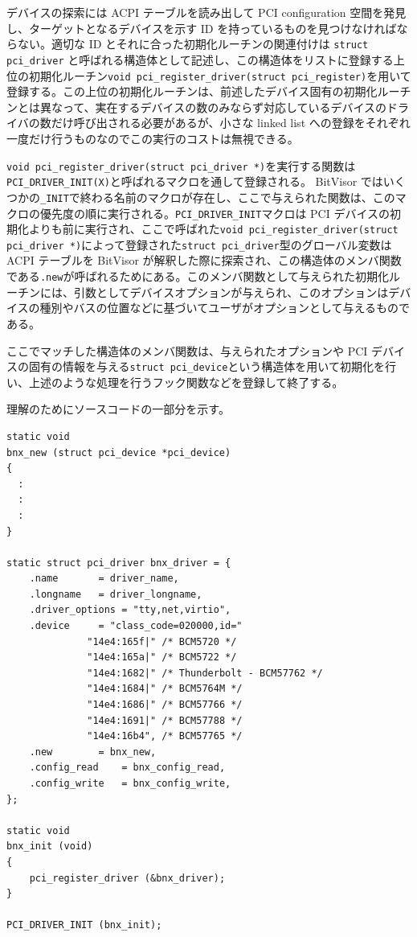\documentclass[a4paper,11pt,report]{ltjsbook}
\begin{document}
デバイスの探索には ACPI テーブルを読み出して PCI configuration 空間を発見し、ターゲットとなるデバイスを示す ID を持っているものを見つけなければならない。適切な ID とそれに合った初期化ルーチンの関連付けは \lstinline!struct pci_driver! と呼ばれる構造体として記述し、この構造体をリストに登録する上位の初期化ルーチン\lstinline!void pci_register_driver(struct pci_register)!を用いて登録する。この上位の初期化ルーチンは、前述したデバイス固有の初期化ルーチンとは異なって、実在するデバイスの数のみならず対応しているデバイスのドライバの数だけ呼び出される必要があるが、小さな linked list への登録をそれぞれ一度だけ行うものなのでこの実行のコストは無視できる。

\lstinline!void pci_register_driver(struct pci_driver *)!を実行する関数は \lstinline!PCI_DRIVER_INIT(X)!と呼ばれるマクロを通して登録される。 BitVisor ではいくつかの\lstinline!_INIT!で終わる名前のマクロが存在し、ここで与えられた関数は、このマクロの優先度の順に実行される。\lstinline!PCI_DRIVER_INIT!マクロは PCI デバイスの初期化よりも前に実行され、ここで呼ばれた\lstinline!void pci_register_driver(struct pci_driver *)!によって登録された\lstinline!struct pci_driver!型のグローバル変数は ACPI テーブルを BitVisor が解釈した際に探索され、この構造体のメンバ関数である\lstinline!.new!が呼ばれるためにある。このメンバ関数として与えられた初期化ルーチンには、引数としてデバイスオプションが与えられ、このオプションはデバイスの種別やバスの位置などに基づいてユーザがオプションとして与えるものである。

ここでマッチした構造体のメンバ関数は、与えられたオプションや PCI デバイスの固有の情報を与える\lstinline!struct pci_device!という構造体を用いて初期化を行い、上述のような処理を行うフック関数などを登録して終了する。

理解のためにソースコードの一部分を示す。

\begin{lstlisting}
static void
bnx_new (struct pci_device *pci_device)
{
  :
  :
  :
}

static struct pci_driver bnx_driver = {
	.name		= driver_name,
	.longname	= driver_longname,
	.driver_options	= "tty,net,virtio",
	.device		= "class_code=020000,id="
			  "14e4:165f|" /* BCM5720 */
			  "14e4:165a|" /* BCM5722 */
			  "14e4:1682|" /* Thunderbolt - BCM57762 */
			  "14e4:1684|" /* BCM5764M */
			  "14e4:1686|" /* BCM57766 */
			  "14e4:1691|" /* BCM57788 */
			  "14e4:16b4", /* BCM57765 */
	.new		= bnx_new,
	.config_read	= bnx_config_read,
	.config_write	= bnx_config_write,
};

static void
bnx_init (void)
{
	pci_register_driver (&bnx_driver);
}

PCI_DRIVER_INIT (bnx_init);
\end{lstlisting}
\end{document}
